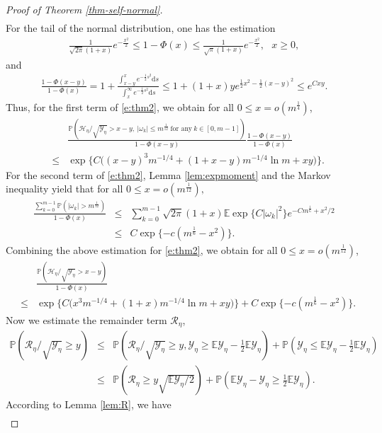 \documentclass[12pt]{amsart}
\theoremstyle{definition}
\theoremstyle{remark}
\numberwithin{equation}{section}
\newcommand{\dif}{\mathrm{d}}
\newcommand{\Y}{\mathcal{Y}}
\newcommand{\E}{\mathbb{E}}            %
\newcommand{\PP}{\mathbb{P}}
\begin{document}
\begin{proof}[Proof of Theorem \ref{thm-self-normal}]
\begin{eqnarray*}
\end{eqnarray*}
For the tail of the normal distribution, one has the estimation
\begin{eqnarray*}
\frac{1}{\sqrt{2\pi}(1+x)} e^{-\frac{x^2}{2}}\le 1-\Phi(x)\le \frac{1}{\sqrt{\pi}(1+x)} e^{-\frac{x^2}{2}}, \ \ \ x \ge 0,
\end{eqnarray*}
and
\begin{eqnarray*}
\frac{1-\Phi(x-y)}{1-\Phi(x)} = 1+\frac{\int_{x-y}^x e^{-\frac12s^2}\dif s}{\int_x^\infty e^{-\frac12s^2}\dif s}
\le 1+(1+x)ye^{\frac12x^2-\frac12(x-y)^2}
\le e^{Cxy}.
	\end{eqnarray*}
Thus, for the first term of \eqref{e:thm2}, we obtain
for all $0 \le x=o(m^{\frac1{4}})$,
\begin{eqnarray*}
&&\frac{\PP(\mathcal H_\eta/\sqrt{\mathcal Y_\eta}>x-y, ~|\omega_k|\le m^{\frac1{12}}~\text{for any}~ k \in [0, m-1] )}{1-\Phi(x-y)}\frac{1-\Phi(x-y)}{1-\Phi(x)}\\
&\le&\exp\big\{C\big((x-y)^3m^{-1/4}+(1+x-y)m^{-1/4}\ln m+xy\big)\big\}.
\end{eqnarray*}
For the second term of \eqref{e:thm2}, Lemma \ref{lem:expmoment} and the Markov inequality yield that
for all $0\le x =o(m^{\frac{1}{12}}) ,$
\begin{eqnarray*}
	\frac{\sum_{k=0}^{m-1}\PP(|\omega_k|>m^{\frac1{12}})}{1-\Phi(x)}
	&\le& \sum_{k=0}^{m-1} \sqrt{2\pi}(1+x)\E\exp\{C|\omega_k|^2\}e^{-Cm^{\frac1{6}}+x^2/2}\\
	&\le& C   \exp\{-c(m^{\frac1{6}}-x^2)\}.
\end{eqnarray*}
Combining the above estimation for \eqref{e:thm2}, we obtain for all $0 \le x=o(m^{\frac1{12}})$,
\begin{eqnarray}\label{e:thm5}
	&&\frac{\PP(\mathcal H_\eta/\sqrt{\mathcal Y_\eta}>x-y )}{1-\Phi(x)} \nonumber\\
	&\le& \exp\big\{C\big(x^3m^{-1/4}+(1+x)m^{-1/4}\ln m+xy\big)\big\}+ C \exp\{-c(m^{\frac1{6}}-x^2)\}.
\end{eqnarray}
Now we estimate the remainder term $\mathcal{R}_\eta$,
\begin{eqnarray*}
\PP(\mathcal{R}_\eta/\sqrt{\Y_\eta}\ge y)
&\le& \PP(\mathcal{R}_\eta/\sqrt{\Y_\eta}\ge y, \Y_\eta\ge \E\Y_\eta-\frac12\E\Y_\eta)+\PP(\Y_\eta\le \E\Y_\eta-\frac12\E\Y_\eta)\\
&\le& \PP(\mathcal{R}_\eta\ge y\sqrt{\E\Y_\eta/2})+\PP( \E\Y_\eta-\Y_\eta\ge\frac12\E\Y_\eta).
\end{eqnarray*}
According to Lemma \ref{lem:R}, we have
\begin{eqnarray*}

\end{eqnarray*}
\end{proof}
\end{document}
